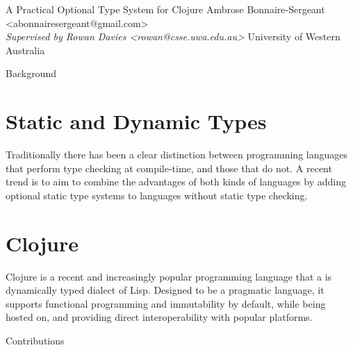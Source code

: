 \documentclass[landscape,final,a0paper,fontscale=0.25]{baposter}
\begin{document}
\begin{poster}
  { A Practical Optional Type System for Clojure }
  { Ambrose Bonnaire-Sergeant <abonnairesergeant@gmail.com>\\
    \emph{Supervised by Rowan Davies <rowan@csse.uwa.edu.au>}}
  { University of Western Australia }

  \begin{posterbox}[name=problem,column=0,row=0]{Background}

\section*{Static and Dynamic Types}

Traditionally there has been a clear distinction between 
programming languages that perform type checking at compile-time, and those that do not.
A recent trend is to aim to combine the advantages of both kinds of languages by adding optional static 
type systems to languages without static type checking.

\section*{Clojure}

Clojure is a recent and increasingly popular programming language that a is dynamically typed dialect of Lisp.
Designed to be a pragmatic language, it supports functional programming and immutability by default,
while being hosted on, and providing direct interoperability with popular platforms.
\end{posterbox}

\begin{posterbox}[name=contribution,column=0,below=problem]{Contributions}


\end{posterbox}
\end{poster}
\end{document}
